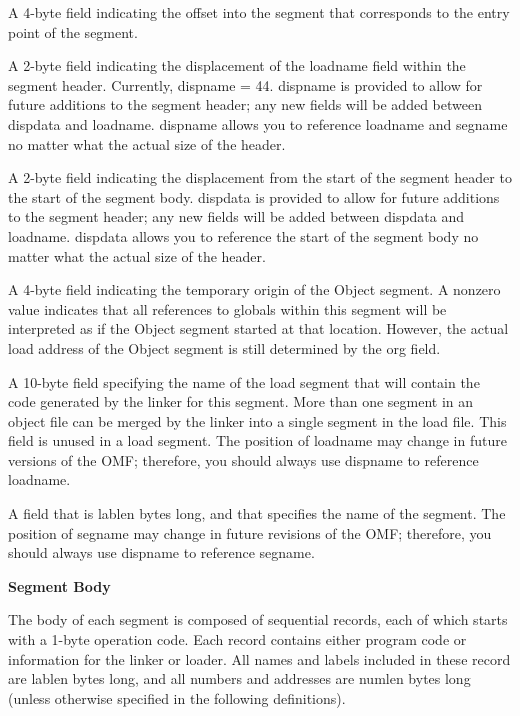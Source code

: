  A 4-byte field indicating the offset into the segment that
corresponds to the entry point of the segment.

 A 2-byte field indicating the displacement of the
{\omf loadname} field within the segment header. Currently, {\omf dispname}
= 44. {\omf dispname} is provided to allow for future additions to the
segment header; any new fields will be added between {\omf dispdata}
and {\omf loadname}. {\omf dispname} allows you to reference {\omf loadname}
and {\omf segname} no matter what the actual size of the header.

 A 2-byte field indicating the displacement from the start
of the segment header to the start of the segment body. {\omf dispdata} is
provided to allow for future additions to the segment header; any new fields
will be added between {\omf dispdata} and {\omf loadname}. {\omf dispdata}
allows you to reference the start of the segment body no matter what the
actual size of the header.

 A 4-byte field indicating the temporary origin of the Object
segment. A nonzero value indicates that all references to globals within
this segment will be interpreted as if the Object segment started at that
location. However, the actual load address of the Object segment is still
determined by the {\omf org} field.

 A 10-byte field specifying the name of the load segment
that will contain the code generated by the linker for this segment. More
than one segment in an object file can be merged by the linker into a single
segment in the load file. This field is unused in a load segment. The
position of {\omf loadname} may change in future versions of the OMF;
therefore, you should always use {\omf dispname} to reference {\omf loadname.}

 A field that is {\omf lablen} bytes long, and that specifies
the name of the segment. The position of {\omf segname} may change in future
revisions of the OMF; therefore, you should always use {\omf dispname} to
reference {\omf segname.}

{\bf Segment Body}

\description
The body of each segment is composed of sequential records, each of which
starts with a 1-byte operation code. Each record contains either program
code or information for the linker or loader. All names and labels included
in these record are {\omf lablen} bytes long, and all numbers and addresses
are {\omf numlen} bytes long (unless otherwise specified in the following
definitions).

